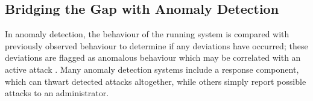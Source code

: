 \documentclass[dvipsnames, 12pt]{article}
\newcommand{\kimmbox}{\textsc{Mbox}}
\begin{document}

\subsection{Bridging the Gap with Anomaly Detection}

In anomaly detection, the behaviour of the running system is compared with
previously observed behaviour to determine if any deviations have occurred;
these deviations are flagged as anomalous behaviour which may be correlated with
an active attack . Many anomaly detection systems include a response
component, which can thwart detected attacks altogether, while others simply
report possible attacks to an administrator.
\end{document}
